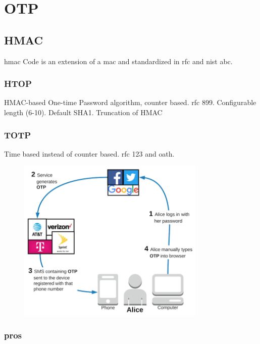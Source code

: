 \section{OTP}

\subsection{HMAC}

\gls{hmac} Code is an extension of a \gls{mac} and standardized in \gls{rfc} and \gls{nist} abc.

\subsubsection{HTOP}

HMAC-based One-time Password algorithm, counter based. \gls{rfc} 899. Configurable length (6-10). Default SHA1. Truncation of HMAC

\subsubsection{TOTP}

Time based instead of counter based. \gls{rfc} 123 and \gls{oath}.


\begin{figure}[hbt]
 	\centering
	\includegraphics[width=0.8\textwidth]{pics/02---authentication-flow-3}
	\caption{}
\end{figure}

\subsubsection{pros}

